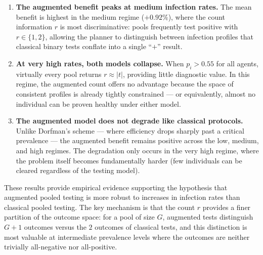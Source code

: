 \documentclass[11pt]{article}
\begin{document}
\begin{enumerate}
    \item \textbf{The augmented benefit peaks at medium infection rates.}
    The mean benefit is highest in the medium regime ($+0.92\%$), where
    the count information $r$ is most discriminative: pools frequently
    test positive with $r \in \{1, 2\}$, allowing the planner to
    distinguish between infection profiles that classical binary tests
    conflate into a single ``$+$'' result.

    \item \textbf{At very high rates, both models collapse.}
    When $p_i > 0.55$ for all agents, virtually every pool returns
    $r \approx |t|$, providing little diagnostic value. In this regime,
    the augmented count offers no advantage because the space of
    consistent profiles is already tightly constrained --- or
    equivalently, almost no individual can be proven healthy under
    either model.

    \item \textbf{The augmented model does not degrade like classical protocols.}
    Unlike Dorfman's scheme --- where efficiency drops sharply past a
    critical prevalence --- the augmented benefit remains positive
    across the low, medium, and high regimes. The degradation only
    occurs in the very high regime, where the problem itself becomes
    fundamentally harder (few individuals can be cleared regardless
    of the testing model).
\end{enumerate}

These results provide empirical evidence supporting the hypothesis
that augmented pooled testing is more robust to increases in infection
rates than classical pooled testing. The key mechanism is that the
count $r$ provides a finer partition of the outcome space: for a pool
of size $G$, augmented tests distinguish $G + 1$ outcomes versus the
$2$ outcomes of classical tests, and this distinction is most valuable
at intermediate prevalence levels where the outcomes are neither
trivially all-negative nor all-positive.
\end{document}
